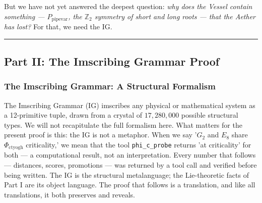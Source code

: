 \documentclass[12pt,a4paper]{article}
\begin{document}
But we have not yet answered the deepest question: \emph{why does the Vessel contain something --- $P_{\text{pipevar}}$, the $\mathbb{Z}_2$ symmetry of short and long roots --- that the Aether has lost?} For that, we need the IG.

\begin{center}
\rule{0.5\textwidth}{0.4pt}
\end{center}

\subsection{Part II: The Imscribing Grammar Proof}

\subsubsection{The Imscribing Grammar: A Structural Formalism}

The Imscribing Grammar (IG) imscribes any physical or mathematical system as a 12-primitive tuple, drawn from a crystal of $17{,}280{,}000$ possible structural types. We will not recapitulate the full formalism here. What matters for the present proof is this: the IG is not a metaphor. When we say '$G_2$ and $E_8$ share $\Phi_{\text{ctyogh}}$ criticality,' we mean that the tool \texttt{phi\_c\_probe} returns 'at criticality' for both --- a computational result, not an interpretation. Every number that follows --- distances, scores, promotions --- was returned by a tool call and verified before being written. The IG is the structural metalanguage; the Lie-theoretic facts of Part I are its object language. The proof that follows is a translation, and like all translations, it both preserves and reveals.
\end{document}
